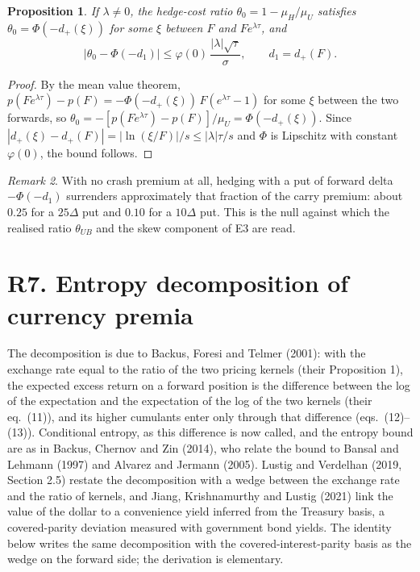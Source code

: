 \documentclass[11pt]{article}
\newtheorem{proposition}{Proposition}
\theoremstyle{remark}
\newtheorem{remark}[proposition]{Remark}
\begin{document}
\begin{proposition}
If $\lambda\ne0$, the hedge-cost ratio $\theta_0=1-\mu_H/\mu_U$ satisfies $\theta_0=\Phi(-d_+(\xi))$ for some $\xi$ between $F$ and $Fe^{\lambda\tau}$, and
\[
\bigl|\theta_0-\Phi(-d_1)\bigr|\le\varphi(0)\,\frac{|\lambda|\sqrt{\tau}}{\sigma},\qquad d_1=d_+(F).
\]
\end{proposition}

\begin{proof}
By the mean value theorem, $p(Fe^{\lambda\tau})-p(F)=-\Phi(-d_+(\xi))\,F(e^{\lambda\tau}-1)$ for some $\xi$ between the two forwards, so $\theta_0=-[p(Fe^{\lambda\tau})-p(F)]/\mu_U=\Phi(-d_+(\xi))$. Since $|d_+(\xi)-d_+(F)|=|\ln(\xi/F)|/s\le|\lambda|\tau/s$ and $\Phi$ is Lipschitz with constant $\varphi(0)$, the bound follows.
\end{proof}

\begin{remark}
With no crash premium at all, hedging with a put of forward delta $-\Phi(-d_1)$ surrenders approximately that fraction of the carry premium: about $0.25$ for a $25\Delta$ put and $0.10$ for a $10\Delta$ put. This is the null against which the realised ratio $\theta_{UB}$ and the skew component of E3 are read.
\end{remark}

\section*{R7. Entropy decomposition of currency premia}

The decomposition is due to Backus, Foresi and Telmer (2001): with the exchange rate equal to the ratio of the two pricing kernels (their Proposition 1), the expected excess return on a forward position is the difference between the log of the expectation and the expectation of the log of the two kernels (their eq.~(11)), and its higher cumulants enter only through that difference (eqs.~(12)--(13)). Conditional entropy, as this difference is now called, and the entropy bound are as in Backus, Chernov and Zin (2014), who relate the bound to Bansal and Lehmann (1997) and Alvarez and Jermann (2005). Lustig and Verdelhan (2019, Section 2.5) restate the decomposition with a wedge between the exchange rate and the ratio of kernels, and Jiang, Krishnamurthy and Lustig (2021) link the value of the dollar to a convenience yield inferred from the Treasury basis, a covered-parity deviation measured with government bond yields. The identity below writes the same decomposition with the covered-interest-parity basis as the wedge on the forward side; the derivation is elementary.
\end{document}
